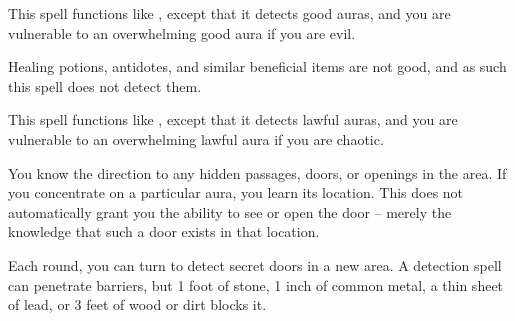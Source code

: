 \begin{spelleffect}
  This spell functions like , except that it detects good auras, and you are vulnerable to an overwhelming good aura if you are evil.
\end{spelleffect}
\begin{spellnotes}
  Healing potions, antidotes, and similar beneficial items are not good, and as such this spell does not detect them.
\end{spellnotes}

\begin{spelleffect}
  This spell functions like , except that it detects lawful auras, and you are vulnerable to an overwhelming lawful aura if you are chaotic.
\end{spelleffect}

\begin{spelleffect}
  You know the direction to any hidden passages, doors, or openings in the area. If you concentrate on a particular aura, you learn its location. This does not automatically grant you the ability to see or open the door -- merely the knowledge that such a door exists in that location.
\end{spelleffect}
\begin{spellnotes}
  Each round, you can turn to detect secret doors in a new area. A detection spell can penetrate barriers, but 1 foot of stone, 1 inch of common metal, a thin sheet of lead, or 3 feet of wood or dirt blocks it.
\end{spellnotes}

